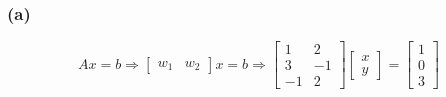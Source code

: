\documentclass[10pt,letterpaper]{article}
\begin{document}
	\subsubsection*{(a)} 
	$$
	Ax = b \Rightarrow  \begin{bmatrix}
	w_1 & w_2
	\end{bmatrix} x = b \Rightarrow \begin{bmatrix}
	1 & 2 \\ 3 & -1 \\ -1 & 2
	\end{bmatrix} \begin{bmatrix}
	x \\ y
	\end{bmatrix} = \begin{bmatrix}
	1 \\ 0 \\ 3
	\end{bmatrix}
	$$ 
	
\end{document}
